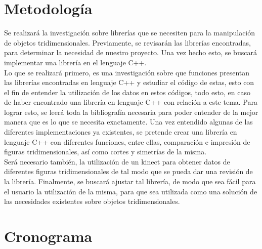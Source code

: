 \documentclass[letterpaper]{article}
\begin{document}
\section{Metodología}


Se realizará la investigación sobre librerías que se necesiten para la manipulación de objetos tridimensionales. Previamente, se revisarán las 
librerías encontradas, para determinar la necesidad de nuestro proyecto. 
Una vez hecho esto, se buscará implementar una librería en el lenguaje C++.\\

Lo que se realizará primero, es una investigación sobre que funciones presentan las librerías encontradas en lenguaje C++ y estudiar el código de estas,
esto con el fin de entender la utilización de los datos en estos códigos, todo esto, en caso de haber encontrado una librería en lenguaje C++ con relación a este tema.
Para lograr esto, se leerá toda la bibliografía necesaria para poder entender de la mejor manera que es lo que se necesita exactamente. Una vez
entendido algunas de las diferentes implementaciones ya existentes, se pretende crear una librería en lenguaje C++ con diferentes funciones, entre ellas,
comparación e impresión de figuras tridimensionales, así como cortes y simetrías de la misma. \\

Será necesario también, la utilización de un
kinect para obtener datos de diferentes figuras tridimensionales de tal modo que se pueda dar una revisión de la librería. Finalmente, se buscará ajustar tal librería,
de modo que sea fácil para el usuario la utilización de la misma, para que sea utilizada como una solución de las necesidades
existentes sobre objetos tridimensionales.\\




\section{Cronograma}
\end{document}
